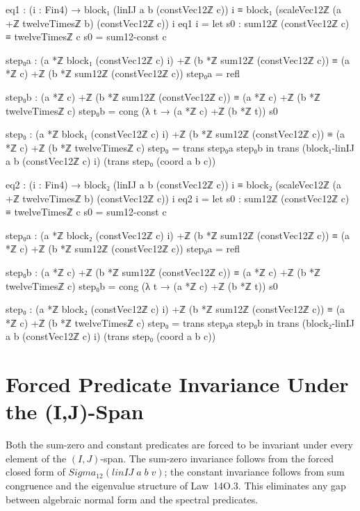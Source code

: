 \documentclass[11pt,a4paper]{book}
\def\Sigma{Sigma}%
\def\texttt#1{#1}%
\def\texorpdfstring#1#2{#2}%
\begin{document}
\begin{code}
    eq1 : (i : Fin4) →
      block₁ (linIJ a b (constVec12ℤ c)) i ≡ block₁ (scaleVec12ℤ (a +ℤ twelveTimesℤ b) (constVec12ℤ c)) i
    eq1 i =
      let
        s0 : sum12ℤ (constVec12ℤ c) ≡ twelveTimesℤ c
        s0 = sum12-const c

        step₀a : (a *ℤ block₁ (constVec12ℤ c) i) +ℤ (b *ℤ sum12ℤ (constVec12ℤ c))
          ≡ (a *ℤ c) +ℤ (b *ℤ sum12ℤ (constVec12ℤ c))
        step₀a = refl

        step₀b : (a *ℤ c) +ℤ (b *ℤ sum12ℤ (constVec12ℤ c))
          ≡ (a *ℤ c) +ℤ (b *ℤ twelveTimesℤ c)
        step₀b = cong (λ t → (a *ℤ c) +ℤ (b *ℤ t)) s0

        step₀ : (a *ℤ block₁ (constVec12ℤ c) i) +ℤ (b *ℤ sum12ℤ (constVec12ℤ c))
          ≡ (a *ℤ c) +ℤ (b *ℤ twelveTimesℤ c)
        step₀ = trans step₀a step₀b
      in
      trans
        (block₁-linIJ a b (constVec12ℤ c) i)
        (trans step₀ (coord a b c))

    eq2 : (i : Fin4) →
      block₂ (linIJ a b (constVec12ℤ c)) i ≡ block₂ (scaleVec12ℤ (a +ℤ twelveTimesℤ b) (constVec12ℤ c)) i
    eq2 i =
      let
        s0 : sum12ℤ (constVec12ℤ c) ≡ twelveTimesℤ c
        s0 = sum12-const c

        step₀a : (a *ℤ block₂ (constVec12ℤ c) i) +ℤ (b *ℤ sum12ℤ (constVec12ℤ c))
          ≡ (a *ℤ c) +ℤ (b *ℤ sum12ℤ (constVec12ℤ c))
        step₀a = refl

        step₀b : (a *ℤ c) +ℤ (b *ℤ sum12ℤ (constVec12ℤ c))
          ≡ (a *ℤ c) +ℤ (b *ℤ twelveTimesℤ c)
        step₀b = cong (λ t → (a *ℤ c) +ℤ (b *ℤ t)) s0

        step₀ : (a *ℤ block₂ (constVec12ℤ c) i) +ℤ (b *ℤ sum12ℤ (constVec12ℤ c))
          ≡ (a *ℤ c) +ℤ (b *ℤ twelveTimesℤ c)
        step₀ = trans step₀a step₀b
      in
      trans
        (block₂-linIJ a b (constVec12ℤ c) i)
        (trans step₀ (coord a b c))
\end{code}


\section{Forced Predicate Invariance Under the \texorpdfstring{$(I,J)$}{(I,J)}-Span}

Both the sum-zero and constant predicates are forced to be
invariant under every element of the $(I,J)$-span.
The sum-zero invariance follows from the forced closed form
of $\Sigma_{12}(\texttt{linIJ}\;a\;b\;v)$;
the constant invariance follows from sum congruence and the
eigenvalue structure of Law~14O.3.  This eliminates any gap between algebraic
normal form and the spectral predicates.
\end{document}
